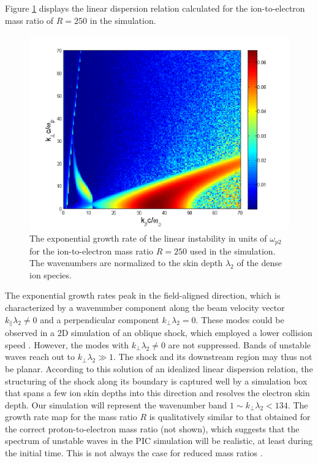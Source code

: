 \documentclass[structabstract]{aa}
\begin{document}
Figure \ref{Dispersion} displays the linear dispersion relation calculated for the ion-to-electron mass ratio of 
$R=250$ in the simulation. 
\begin{figure}
\includegraphics[width=\columnwidth]{15294f02.png}
\caption{The exponential growth rate of the linear instability in units of $\omega_{p2}$ for the ion-to-electron 
mass ratio $R=250$ used in the simulation. The wavenumbers are normalized to the skin depth $\lambda_2$ of the 
dense ion species.}
\label{Dispersion}
\end{figure}
The exponential growth rates peak in the field-aligned direction, which is characterized by a wavenumber component
along the beam velocity vector $k_\parallel \lambda_2 \neq 0$ and a perpendicular component $k_\perp \lambda_2 = 0$. 
These modes could be observed in a 2D simulation of an oblique shock, which employed a lower collision speed 
\citep{Dieckmann:2010qf}. However, the modes with $k_\perp \lambda_2 \neq 0$ are not suppressed. Bands of unstable 
waves reach out to $k_\perp \lambda_2 \gg 1$. The shock and its downstream region may thus not be planar. 
According to this solution of an idealized linear dispersion relation, the structuring of the shock along its 
boundary is captured well by a simulation box that spans a few ion skin depths into this direction and resolves 
the electron skin depth. Our simulation will represent the wavenumber band $1 \sim k_\perp \lambda_2 < 134$. The 
growth rate map for the mass ratio $R$ is qualitatively similar to that obtained for the correct proton-to-electron 
mass ratio (not shown), which suggests that the spectrum of unstable waves in the PIC simulation will be realistic, 
at least during the initial time. This is not always the case for reduced mass ratios \citep{Bret:2010fj}.
\end{document}
